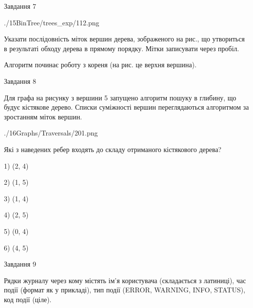 \documentclass[12pt, ukrainian]{article}
\begin{document}
{\vspace{10mm}\par

\newpage
\begin{minipage}[t]{9.7cm}
               
{\begin{center}Завдання {7}\end{center}}
\vspace{-6mm}

\begin{center}
	{./15BinTree/trees_exp/112.png}
\end{center}
Указати послідовність міток вершин дерева, зображеного на рис., що утвориться в результаті обходу дерева в прямому порядку. Мітки записувати через пробіл.\par Алгоритм починає роботу з кореня (на рис. це верхня вершина).\par

\end{minipage}
\vline \hspace{8mm}
\begin{minipage}[t]{8.0cm}
               
{\begin{center}Завдання {8}\end{center}}
\vspace{-6mm}
Для графа на рисунку з вершини 5 запущено алгоритм пошуку в глибину, що будує кістякове дерево. Списки суміжності вершин переглядаються алгоритмом за зростанням міток вершин.\par
\begin{center}
	{./16Graphs/Traversals/201.png}
\end{center}
\par Які з наведених ребер входять до складу отриманого кістякового дерева?\par
1) (2, 4)\par
2) (1, 5)\par
3) (1, 4)\par
4) (2, 5)\par
5) (0, 4)\par
6) (4, 5)\par
{\vskip 15pt} \par

\end{minipage}

               
{\begin{center}Завдання {9}\end{center}}
\vspace{-6mm}
Рядки журналу через кому містять ім'я користувача (складається з латиниці), час події (фор\-мат як у прикладі), тип події (ERROR, WARNING, INFO, STATUS), код події (ціле).

}
\end{document}
